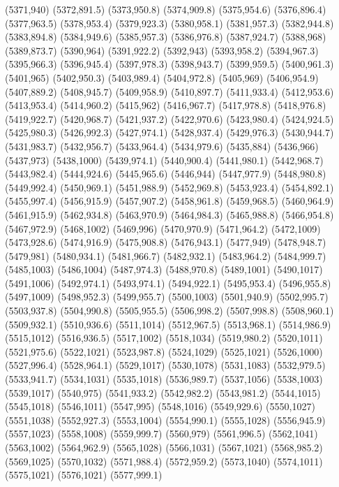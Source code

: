 (5371,940)
(5372,891.5)
(5373,950.8)
(5374,909.8)
(5375,954.6)
(5376,896.4)
(5377,963.5)
(5378,953.4)
(5379,923.3)
(5380,958.1)
(5381,957.3)
(5382,944.8)
(5383,894.8)
(5384,949.6)
(5385,957.3)
(5386,976.8)
(5387,924.7)
(5388,968)
(5389,873.7)
(5390,964)
(5391,922.2)
(5392,943)
(5393,958.2)
(5394,967.3)
(5395,966.3)
(5396,945.4)
(5397,978.3)
(5398,943.7)
(5399,959.5)
(5400,961.3)
(5401,965)
(5402,950.3)
(5403,989.4)
(5404,972.8)
(5405,969)
(5406,954.9)
(5407,889.2)
(5408,945.7)
(5409,958.9)
(5410,897.7)
(5411,933.4)
(5412,953.6)
(5413,953.4)
(5414,960.2)
(5415,962)
(5416,967.7)
(5417,978.8)
(5418,976.8)
(5419,922.7)
(5420,968.7)
(5421,937.2)
(5422,970.6)
(5423,980.4)
(5424,924.5)
(5425,980.3)
(5426,992.3)
(5427,974.1)
(5428,937.4)
(5429,976.3)
(5430,944.7)
(5431,983.7)
(5432,956.7)
(5433,964.4)
(5434,979.6)
(5435,884)
(5436,966)
(5437,973)
(5438,1000)
(5439,974.1)
(5440,900.4)
(5441,980.1)
(5442,968.7)
(5443,982.4)
(5444,924.6)
(5445,965.6)
(5446,944)
(5447,977.9)
(5448,980.8)
(5449,992.4)
(5450,969.1)
(5451,988.9)
(5452,969.8)
(5453,923.4)
(5454,892.1)
(5455,997.4)
(5456,915.9)
(5457,907.2)
(5458,961.8)
(5459,968.5)
(5460,964.9)
(5461,915.9)
(5462,934.8)
(5463,970.9)
(5464,984.3)
(5465,988.8)
(5466,954.8)
(5467,972.9)
(5468,1002)
(5469,996)
(5470,970.9)
(5471,964.2)
(5472,1009)
(5473,928.6)
(5474,916.9)
(5475,908.8)
(5476,943.1)
(5477,949)
(5478,948.7)
(5479,981)
(5480,934.1)
(5481,966.7)
(5482,932.1)
(5483,964.2)
(5484,999.7)
(5485,1003)
(5486,1004)
(5487,974.3)
(5488,970.8)
(5489,1001)
(5490,1017)
(5491,1006)
(5492,974.1)
(5493,974.1)
(5494,922.1)
(5495,953.4)
(5496,955.8)
(5497,1009)
(5498,952.3)
(5499,955.7)
(5500,1003)
(5501,940.9)
(5502,995.7)
(5503,937.8)
(5504,990.8)
(5505,955.5)
(5506,998.2)
(5507,998.8)
(5508,960.1)
(5509,932.1)
(5510,936.6)
(5511,1014)
(5512,967.5)
(5513,968.1)
(5514,986.9)
(5515,1012)
(5516,936.5)
(5517,1002)
(5518,1034)
(5519,980.2)
(5520,1011)
(5521,975.6)
(5522,1021)
(5523,987.8)
(5524,1029)
(5525,1021)
(5526,1000)
(5527,996.4)
(5528,964.1)
(5529,1017)
(5530,1078)
(5531,1083)
(5532,979.5)
(5533,941.7)
(5534,1031)
(5535,1018)
(5536,989.7)
(5537,1056)
(5538,1003)
(5539,1017)
(5540,975)
(5541,933.2)
(5542,982.2)
(5543,981.2)
(5544,1015)
(5545,1018)
(5546,1011)
(5547,995)
(5548,1016)
(5549,929.6)
(5550,1027)
(5551,1038)
(5552,927.3)
(5553,1004)
(5554,990.1)
(5555,1028)
(5556,945.9)
(5557,1023)
(5558,1008)
(5559,999.7)
(5560,979)
(5561,996.5)
(5562,1041)
(5563,1002)
(5564,962.9)
(5565,1028)
(5566,1031)
(5567,1021)
(5568,985.2)
(5569,1025)
(5570,1032)
(5571,988.4)
(5572,959.2)
(5573,1040)
(5574,1011)
(5575,1021)
(5576,1021)
(5577,999.1)
